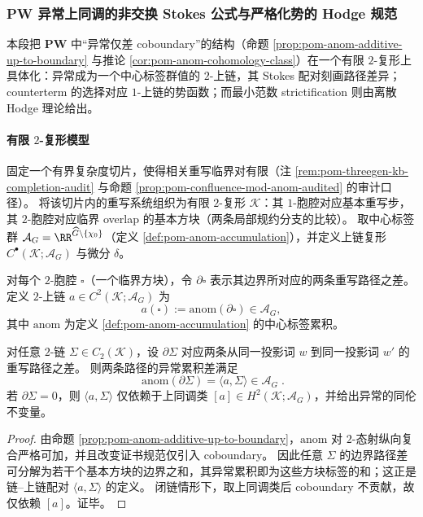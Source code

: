 \subsubsection{PW 异常上同调的非交换 Stokes 公式与严格化势的 Hodge 规范}\label{subsubsec:pom-pw-noncommutative-stokes-counterterm-hodge}
本段把 \(\mathbf{PW}\) 中“异常仅差 coboundary”的结构（命题 \ref{prop:pom-anom-additive-up-to-boundary} 与推论 \ref{cor:pom-anom-cohomology-class}）在一个有限 \(2\)-复形上具体化：异常成为一个中心标签群值的 \(2\)-上链，其 Stokes 配对刻画路径差异；counterterm 的选择对应 \(1\)-上链的势函数；而最小范数 strictification 则由离散 Hodge 理论给出。

\paragraph{有限 \(2\)-复形模型}
固定一个有界复杂度切片，使得相关重写临界对有限（注 \ref{rem:pom-threegen-kb-completion-audit} 与命题 \ref{prop:pom-confluence-mod-anom-audited} 的审计口径）。
将该切片内的重写系统组织为有限 \(2\)-复形 \(\mathcal K\)：其 \(1\)-胞腔对应基本重写步，其 \(2\)-胞腔对应临界 overlap 的基本方块（两条局部规约分支的比较）。
取中心标签群 \(\mathcal{A}_G=\RR^{\widehat G\setminus\{\chi_0\}}\)（定义 \ref{def:pom-anom-accumulation}），并定义上链复形 \(C^\bullet(\mathcal K;\mathcal{A}_G)\) 与微分 \(\delta\)。

\begin{definition}[异常 \(2\)-上链]\label{def:pom-pw-anom-2cochain}
对每个 \(2\)-胞腔 \(\square\)（一个临界方块），令 \(\partial\square\) 表示其边界所对应的两条重写路径之差。
定义 \(2\)-上链 \(a\in C^2(\mathcal K;\mathcal{A}_G)\) 为
\[
a(\square):=\mathrm{anom}(\partial\square)\in\mathcal{A}_G,
\]
其中 \(\mathrm{anom}\) 为定义 \ref{def:pom-anom-accumulation} 的中心标签累积。
\end{definition}

\begin{theorem}\label{thm:pom-pw-noncommutative-stokes}
对任意 \(2\)-链 \(\Sigma\in C_2(\mathcal K)\)，设 \(\partial\Sigma\) 对应两条从同一投影词 \(w\) 到同一投影词 \(w'\) 的重写路径之差。
则两条路径的异常累积差满足
\[
\boxed{\;
\mathrm{anom}(\partial\Sigma)=\langle a,\Sigma\rangle\in\mathcal{A}_G\; }.
\]
若 \(\partial\Sigma=0\)，则 \(\langle a,\Sigma\rangle\) 仅依赖于上同调类 \([a]\in H^2(\mathcal K;\mathcal{A}_G)\)，并给出异常的同伦不变量。
\end{theorem}
\begin{proof}
由命题 \ref{prop:pom-anom-additive-up-to-boundary}，\(\mathrm{anom}\) 对 \(2\)-态射纵向复合严格可加，并且改变证书规范仅引入 coboundary。
因此任意 \(\Sigma\) 的边界路径差可分解为若干个基本方块的边界之和，其异常累积即为这些方块标签的和；这正是链--上链配对 \(\langle a,\Sigma\rangle\) 的定义。
闭链情形下，取上同调类后 coboundary 不贡献，故仅依赖 \([a]\)。证毕。
\end{proof}

